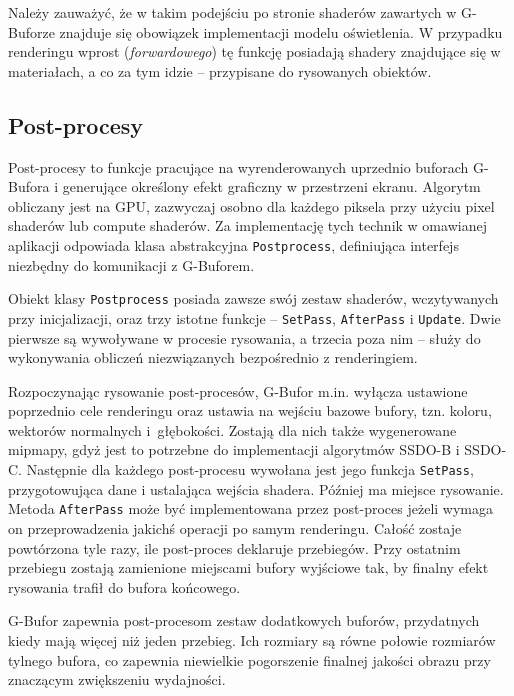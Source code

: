 		Należy zauważyć, że w takim podejściu po stronie shaderów zawartych w G-Buforze znajduje się obowiązek implementacji modelu oświetlenia. W przypadku renderingu wprost (\emph{forwardowego}) tę funkcję posiadają shadery znajdujące się w materiałach, a co za tym idzie -- przypisane do rysowanych obiektów.
		
		\subsection{Post-procesy}
		\label{t:budowa:rendering:postprocesy}
		
		
		Post-procesy to funkcje pracujące na wyrenderowanych uprzednio buforach G-Bufora i generujące określony efekt graficzny w przestrzeni ekranu. Algorytm obliczany jest na GPU, zazwyczaj osobno dla każdego piksela przy użyciu pixel shaderów lub compute shaderów. Za implementację tych technik w omawianej aplikacji odpowiada klasa abstrakcyjna \texttt{Postprocess}, definiująca interfejs niezbędny do komunikacji z G-Buforem.
		
		Obiekt klasy \texttt{Postprocess} posiada zawsze swój zestaw shaderów, wczytywanych przy inicjalizacji, oraz trzy istotne funkcje -- \texttt{SetPass}, \texttt{AfterPass} i \texttt{Update}. Dwie pierwsze są wywoływane w procesie rysowania, a trzecia poza nim -- służy do wykonywania obliczeń niezwiązanych bezpośrednio z renderingiem.
		
		Rozpoczynając rysowanie post-procesów, G-Bufor m.in. wyłącza ustawione poprzednio cele renderingu oraz ustawia na wejściu bazowe bufory, tzn. koloru, wektorów normalnych i~głębokości. Zostają dla nich także wygenerowane mipmapy, gdyż jest to potrzebne do implementacji algorytmów SSDO-B i SSDO-C. Następnie dla każdego post-procesu wywołana jest jego funkcja \texttt{SetPass}, przygotowująca dane i ustalająca wejścia shadera. Później ma miejsce rysowanie. Metoda \texttt{AfterPass} może być implementowana przez post-proces jeżeli wymaga on przeprowadzenia jakichś operacji po samym renderingu. Całość zostaje powtórzona tyle razy, ile post-proces deklaruje przebiegów. Przy ostatnim przebiegu zostają zamienione miejscami bufory wyjściowe tak, by finalny efekt rysowania trafił do bufora końcowego.
		
		G-Bufor zapewnia post-procesom zestaw dodatkowych buforów, przydatnych kiedy mają więcej niż jeden przebieg. Ich rozmiary są równe połowie rozmiarów tylnego bufora, co zapewnia niewielkie pogorszenie finalnej jakości obrazu przy znaczącym zwiększeniu wydajności.
		
